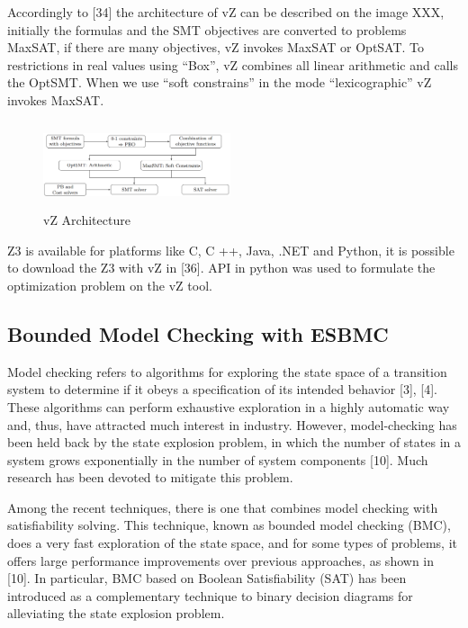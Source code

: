 Accordingly to [34] the architecture of vZ can be described on the image XXX, initially the formulas and the SMT objectives are converted to problems MaxSAT, if there are many objectives, vZ invokes MaxSAT or OptSAT. To restrictions in real values using “Box”, vZ combines all linear arithmetic and calls the OptSMT. When we use “soft constrains” in the mode “lexicographic” vZ invokes MaxSAT.
\begin{figure}[ht]
	\centering
  \includegraphics[width=0.49\textwidth, height=95px]{Image/vzArch.png} 
	\caption{vZ Architecture}
	\label{fig2}
\end{figure}

Z3 is available for platforms like C, C ++, Java, .NET and Python, it is possible to download the Z3 with vZ in [36]. API in python was used to formulate the optimization problem on the vZ tool. 

\subsection{Bounded Model Checking with ESBMC}

Model checking refers to algorithms for exploring the state space of a transition system to determine if it obeys a speciﬁcation of its intended behavior [3], [4]. These algorithms can perform exhaustive exploration in a highly automatic way and, thus, have attracted much interest in industry. However, model-checking has been held back by the state explosion problem, in which the number of states in a system grows exponentially in the number of system components [10]. Much research has been devoted to mitigate this problem.

Among the recent techniques, there is one that combines model checking with satisﬁability solving. This technique, known as bounded model checking (BMC), does a very fast exploration of the state space, and for some types of problems, it offers large performance improvements over previous approaches, as shown in [10]. In particular, BMC based on Boolean Satisfiability (SAT) has been introduced as a complementary technique to binary decision diagrams for alleviating the state explosion problem. 

